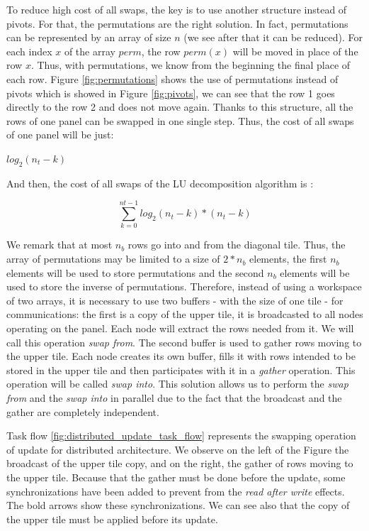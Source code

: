 To reduce high cost of all swaps, the key is to use another structure instead of pivots. For that, the permutations are the right solution. In fact, permutations can be represented by an array of size $n$ (we see after that it can be reduced). For each index $x$ of the array $perm$, the row $perm(x)$ will be moved in place of the row $x$. Thus, with permutations, we know from the beginning the final place of each row. 
Figure \ref{fig:permutations} shows the use of permutations instead of pivots which is showed in Figure \ref{fig:pivots}, we can see that the row 1 goes directly to the row 2 and does	 not move again.
Thanks to this structure, all the rows of one panel can be swapped in one single step. Thus, the cost of all swaps of one panel will be just:
\begin{center}
$log_2(n_t-k)$
\end{center}
And then, the cost of all swaps of the LU decomposition algorithm is :
\begin{center}
$$\sum_{k=0}^{nt-1} log_2(n_t-k)*(n_t-k)$$
\end{center}
We remark that at most $n_b$ rows go into and from the diagonal tile. Thus, the array of permutations may be limited to a size of $2*n_b$ elements, the first $n_b$ elements will be used to store permutations and the second $n_b$ elements will be used to store the inverse of permutations. Therefore, instead of using a workspace of two arrays, it is necessary to use two buffers - with the size of one tile - for communications: the first is a copy of the upper tile, it is broadcasted to all nodes operating on the panel. Each node will extract the rows needed from it. We will call this operation \emph{swap from}. The second buffer is used to gather rows moving to the upper tile. Each node creates its own buffer, fills it with rows intended to be stored in the upper tile and then participates with it in a \textit{gather} operation. This operation will be called \emph{swap into}. This solution allows us to perform the \emph{swap from} and the \emph{swap into} in parallel due to the fact that the broadcast and the gather are completely independent.

Task flow \ref{fig:distributed_update_task_flow} represents the swapping operation of update for distributed architecture. We observe on the left of the Figure the broadcast of the upper tile copy, and on the right, the gather of rows moving to the upper tile. Because that the gather must be done before the update, some synchronizations have been added to prevent from the \emph{read after write} effects. The bold arrows show these synchronizations. We can see also that the copy of the upper tile must be applied before its update.

